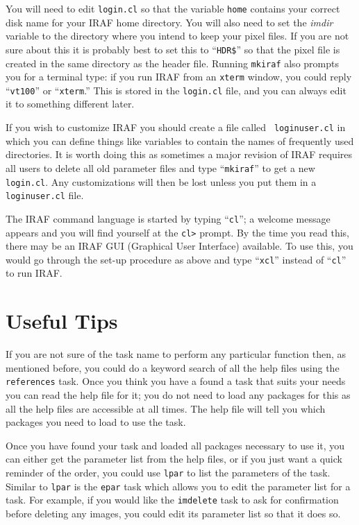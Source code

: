 You will need to edit {\tt login.cl} so that the variable {\tt home}
contains your correct disk name for your IRAF home directory. You will
also need to set the {\it imdir} variable to the directory where you intend
to keep your pixel files. If you are not sure about this it is
probably best to set this to ``{\tt HDR\$}'' so that the pixel file is
created in the same directory as the header file. Running {\tt mkiraf} also
prompts you for a terminal type: if you run IRAF from an {\tt xterm}
window, you could reply ``{\tt vt100}'' or ``{\tt xterm}.''
This is stored in the {\tt login.cl} file, and you
can always edit it to something different later.

If you wish to customize IRAF you should create a file called {\tt
loginuser.cl} in which you can define things like variables to
contain the names of frequently used directories. It is worth doing
this as sometimes a major revision of IRAF requires all users to
delete all old parameter files and type ``{\tt mkiraf}'' to get a new {\tt
login.cl}.  Any customizations will then be lost unless you put them in
a {\tt loginuser.cl} file.

The IRAF command language is started by typing ``{\tt cl}'';  a welcome
message appears and you will find yourself at the {\tt cl>} prompt.
By the time you read this, there may be an IRAF GUI (Graphical User
Interface) available. To use this, you would go through the set-up
procedure as above and type ``{\tt xcl}'' instead of ``{\tt cl}''
to run IRAF.

\section{Useful Tips}

If you are not sure of the task name to perform any particular
function then, as mentioned before, you could do a keyword search of
all the help files using the {\tt references} task. Once you think you
have a found a task that suits your needs you can read the help file
for it; you do not need to load any packages for this as all the help
files are accessible at all times. The help file will tell you which
packages you need to load to use the task.

Once you have found your task and loaded all packages necessary to use
it, you can either get the parameter list from the help files, or
if you just want a quick reminder of the order, you could use
{\tt lpar} to list the parameters of the task.  Similar to {\tt lpar}
is the {\tt epar} task which allows you to edit the parameter list for
a task. For example, if you would like the {\tt imdelete} task to
ask for confirmation before deleting any images, you could edit its
parameter list so that it does so.

